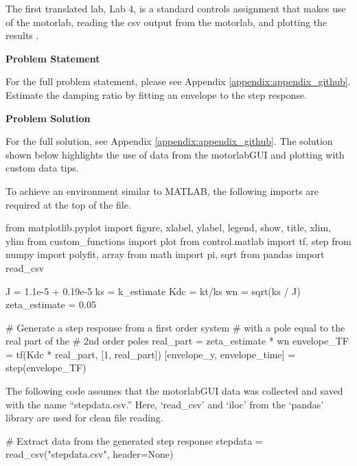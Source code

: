 The first translated lab, Lab 4, is a standard controls assignment that makes use of the motorlab, reading the csv output from the
motorlab, and plotting the results \cite{controls-4}. 

\label{control_assignment_1}

\begin{tcolorbox}[breakable, enhanced jigsaw, title=ME 570: Assignment \ref{control_assignment_1}, 
    colframe=ksu-purple, colback=ksu-gray]

    \textbf{Problem Statement}
    \parindent15pt

    For the full problem statement, please see Appendix \ref{appendix:appendix_github}. Estimate
    the damping ratio by fitting an envelope to the step response.
    
    \tcblower
    \textbf{Problem Solution}
    \parindent15pt

    For the full solution, see Appendix \ref{appendix:appendix_github}. The solution shown below
    highlights the use of data from the motorlabGUI and plotting with custom data tips.

    To achieve an environment similar to MATLAB, the following imports are required at the top of the file.

\begin{python}
from matplotlib.pyplot import figure, xlabel, ylabel, legend, show, title, xlim, ylim
from custom_functions import plot
from control.matlab import tf, step
from numpy import polyfit, array
from math import pi, sqrt
from pandas import read_csv
\end{python}

\begin{python}
J = 1.1e-5 + 0.19e-5
ks = k_estimate
Kdc = kt/ks
wn = sqrt(ks / J)
zeta_estimate = 0.05
 
# Generate a step response from a first order system 
# with a pole equal to the real part of the
# 2nd order poles
real_part = zeta_estimate * wn
envelope_TF = tf(Kdc * real_part, [1, real_part])
[envelope_y, envelope_time] = step(envelope_TF)
\end{python}

The following code assumes that the motorlabGUI data was collected
and saved with the name ``stepdata.csv.'' Here, `read\_csv' and
`iloc' from the `pandas' library are used for clean file reading.

\begin{python}
# Extract data from the generated step response
stepdata = read_csv("stepdata.csv", header=None)


\end{python}
\end{tcolorbox}
